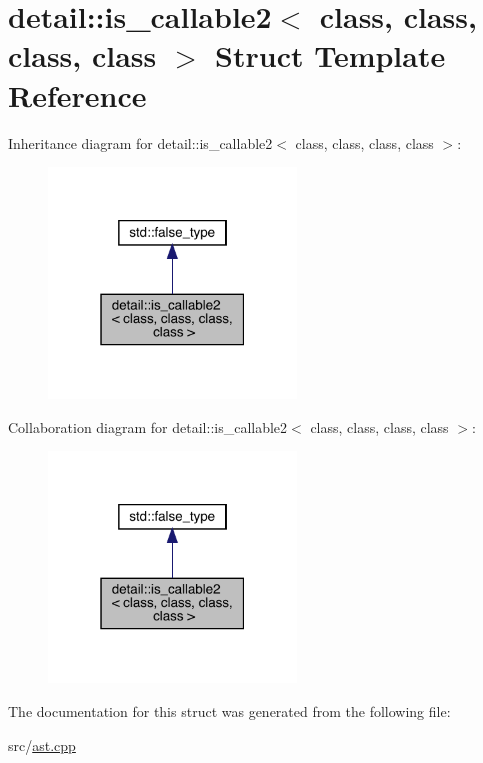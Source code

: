 \hypertarget{structdetail_1_1is__callable2}{}\section{detail\+:\+:is\+\_\+callable2$<$ class, class, class, class $>$ Struct Template Reference}
\label{structdetail_1_1is__callable2}


Inheritance diagram for detail\+:\+:is\+\_\+callable2$<$ class, class, class, class $>$\+:\nopagebreak
\begin{figure}[H]
\begin{center}
\leavevmode
\includegraphics[width=187pt]{structdetail_1_1is__callable2__inherit__graph}
\end{center}
\end{figure}


Collaboration diagram for detail\+:\+:is\+\_\+callable2$<$ class, class, class, class $>$\+:\nopagebreak
\begin{figure}[H]
\begin{center}
\leavevmode
\includegraphics[width=187pt]{structdetail_1_1is__callable2__coll__graph}
\end{center}
\end{figure}


The documentation for this struct was generated from the following file\+:\begin{DoxyCompactItemize}
\item 
src/\hyperlink{ast_8cpp}{ast.\+cpp}\end{DoxyCompactItemize}
